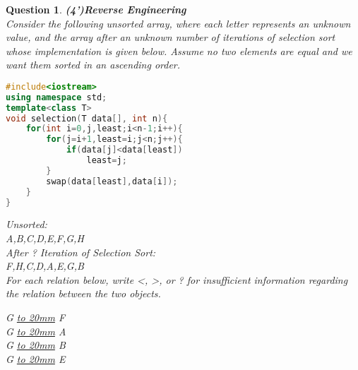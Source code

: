 \documentclass[10.5pt]{article}
\newtheorem{Q}{Question}
\begin{document}
	\begin{Q}\textbf{(4')Reverse Engineering}\\
        Consider the following unsorted array, where each letter represents an unknown value, and the array after an unknown number of iterations of selection sort whose implementation is given below. Assume no two elements are equal and we want them sorted in an ascending order.

\hrulefill
\rm{
\begin{lstlisting}[language=C++]
#include<iostream>
using namespace std;
template<class T>
void selection(T data[], int n){
	for(int i=0,j,least;i<n-1;i++){
		for(j=i+1,least=i;j<n;j++){
			if(data[j]<data[least])
				least=j;
		}
		swap(data[least],data[i]);
	}
}
\end{lstlisting}
}

		\vspace{1cm}
		Unsorted:\\
		A,B,C,D,E,F,G,H\\


		After ? Iteration of Selection Sort:\\
		F,H,C,D,A,E,G,B\\
        

        For each relation below, write \textless, \textgreater, or ? for insufficient information regarding the relation between the two objects.\\

		\begin{center}
		G \underline{\hbox to 20mm{}} F\\

		G \underline{\hbox to 20mm{}} A\\

		G \underline{\hbox to 20mm{}} B\\

		G \underline{\hbox to 20mm{}} E\\
		\end{center}


	
       
	\end{Q}
	
	
	
\pagebreak
	
\end{document}
